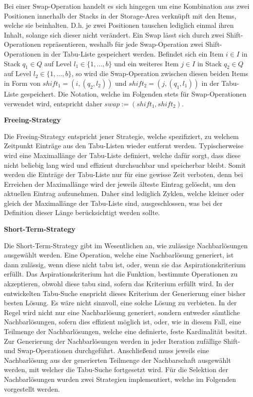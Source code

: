 Bei einer Swap-Operation handelt es sich hingegen um eine Kombination aus zwei Positionen innerhalb der Stacks in der Storage-Area verknüpft mit den Items, welche sie beinhalten. D.h. je zwei Positionen tauschen lediglich einmal ihren Inhalt,
solange sich dieser nicht verändert. Ein Swap lässt sich durch zwei Shift-Operationen repräsentieren, weshalb für jede Swap-Operation
zwei Shift-Operationen in der Tabu-Liste gespeichert werden. Befindet sich ein Item $i \in I$ in Stack $q_1 \in Q$ auf Level
$l_1 \in \{1, ..., b\}$ und ein weiteres Item $j \in I$ in Stack $q_2 \in Q$ auf Level $l_2 \in \{1, ..., b\}$,
so wird die Swap-Operation zwischen diesen beiden Items in Form von $shift_1 = (i, (q_2, l_2))$ und $shift_2 = (j, (q_1, l_1))$
in der Tabu-Liste gespeichert. Die Notation, welche im Folgenden stets für Swap-Operationen verwendet wird,
entspricht daher $swap := (shift_1, shift_2)$.

\textbf{Freeing-Strategy}

Die Freeing-Strategy entspricht jener Strategie, welche spezifiziert, zu welchem Zeitpunkt Einträge aus den
Tabu-Listen wieder entfernt werden. Typischerweise wird eine Maximallänge der Tabu-Liste definiert,
welche dafür sorgt, dass diese nicht beliebig lang wird und effizient durchsuchbar und speicherbar bleibt.
Somit werden die Einträge der Tabu-Liste nur für eine gewisse Zeit verboten, denn bei Erreichen der Maximallänge
wird der jeweils älteste Eintrag gelöscht, um den aktuellen Eintrag aufzunehmen.
Daher sind lediglich Zyklen, welche kleiner oder gleich der Maximallänge der Tabu-Liste sind,
ausgeschlossen, was bei der Definition dieser Länge berücksichtigt werden sollte.

\textbf{Short-Term-Strategy}

Die Short-Term-Strategy gibt im Wesentlichen an, wie zulässige Nachbarlösungen ausgewählt werden.
Eine Operation, welche eine Nachbarlösung generiert, ist dann zulässig, wenn diese nicht tabu ist,
oder, wenn sie das Aspirationskriterium erfüllt. Das Aspirationskriterium hat die Funktion, bestimmte
Operationen zu akzeptieren, obwohl diese tabu sind, sofern das Kriterium erfüllt wird.
In der entwickelten Tabu-Suche enspricht dieses Kriterium der Generierung einer bisher besten Lösung.
Es wäre nicht sinnvoll, eine solche Lösung zu verbieten.\newline
In der Regel wird nicht nur eine Nachbarlösung generiert, sondern entweder sämtliche Nachbarlösungen,
sofern dies effizient möglich ist, oder, wie in diesem Fall, eine Teilmenge der Nachbarlösungen,
welche eine definierte, feste Kardinalität besitzt. Zur Generierung der Nachbarlösungen werden in jeder
Iteration zufällige Shift- und Swap-Operationen durchgeführt. Anschließend muss jeweils eine Nachbarlösung
aus der generierten Teilmenge der Nachbarschaft ausgewählt werden, mit welcher die Tabu-Suche fortgesetzt wird.
Für die Selektion der Nachbarlösungen wurden zwei Strategien implementiert, welche im Folgenden vorgestellt werden.

